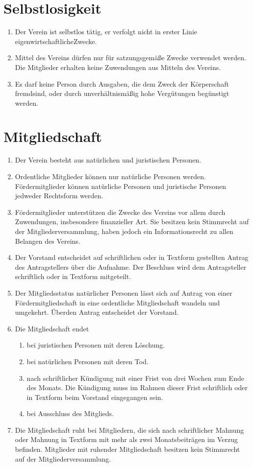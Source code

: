 \documentclass[a4paper, 12pt]{scrartcl}
\begin{document}
\section{Selbstlosigkeit}

\begin{enumerate}
  \item Der Verein ist selbstlos tätig, er verfolgt nicht in erster Linie eigenwirtschaftlicheZwecke.
  \item Mittel des Vereins dürfen nur für satzungsgemäße Zwecke verwendet werden. Die Mitglieder erhalten keine Zuwendungen aus Mitteln des Vereins.
  \item Es darf keine Person durch Ausgaben, die dem Zweck der Körperschaft fremdsind, oder durch unverhältnismäßig hohe Vergütungen begünstigt werden.
\end{enumerate}

\section{Mitgliedschaft}
\begin{enumerate}
  \item Der Verein besteht aus natürlichen und juristischen Personen.
  \item Ordentliche Mitglieder können nur natürliche Personen werden. Fördermitglieder können natürliche Personen und juristische Personen jedweder Rechtsform werden.
  \item Fördermitglieder unterstützen die Zwecke des Vereins vor allem durch Zuwendungen, insbesondere finanzieller Art. Sie besitzen kein Stimmrecht auf der Mitgliederversammlung, haben jedoch ein Informationsrecht zu allen Belangen des Vereins.
  \item Der Vorstand entscheidet auf schriftlichen oder in Textform gestellten Antrag des Antragstellers über die Aufnahme. Der Beschluss wird dem Antragsteller schriftlich oder in Textform mitgeteilt.
  \item Der Mitgliedsstatus natürlicher Personen lässt sich auf Antrag von einer Fördermitgliedschaft in eine ordentliche Mitgliedschaft wandeln und umgekehrt. Überden Antrag entscheidet der Vorstand.
  \item Die Mitgliedschaft endet
  \begin{enumerate}
    \item bei juristischen Personen mit deren Löschung.
    \item bei natürlichen Personen mit deren Tod.
    \item nach schriftlicher Kündigung mit einer Frist von drei Wochen zum Ende des Monats. Die Kündigung muss im Rahmen dieser Frist schriftlich oder in Textform beim Vorstand eingegangen sein.
    \item bei Ausschluss des Mitglieds.
  \end{enumerate}
  \item Die Mitgliedschaft ruht bei Mitgliedern, die sich nach schriftlicher Mahnung oder Mahnung in Textform mit mehr als zwei Monatsbeiträgen im Verzug befinden. Mitglieder mit ruhender Mitgliedschaft besitzen kein Stimmrecht auf der Mitgliederversammlung.
\end{enumerate}
\end{document}
